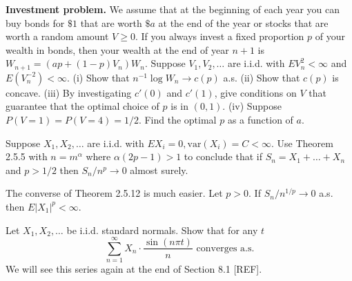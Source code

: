   \begin{exercise}[Durrett 2.4.3]
    \textbf{Investment problem.} We assume that at the beginning of each year you can buy bonds for $\$1$ that are worth $\$a$ at the end of the year or stocks that are worth a random amount $V \geq 0$. If you always invest a fixed proportion $p$ of your wealth in bonds, then your wealth at the end of year $n + 1$ is $W_{n+1} = (ap + (1 - p)V_n)W_n$. Suppose $V_1, V_2, \dots$ are i.i.d. with $EV_n^2 < \infty$ and $E(V_n^{-2}) < \infty$. (i) Show that $n^{-1} \log W_n \to c(p)$ a.s. (ii) Show that $c(p)$ is concave. (iii) By investigating $c'(0)$ and $c'(1)$, give conditions on $V$ that guarantee that the optimal choice of $p$ is in $(0, 1)$. (iv) Suppose $P(V = 1) = P(V = 4) = 1/2$. Find the optimal $p$ as a function of $a$.
  \end{exercise}
  \begin{solution}

  \end{solution}

  \begin{exercise}[Durrett 2.5.1]
    Suppose $X_1, X_2, \dots$ are i.i.d. with $EX_i = 0, \text{var}(X_i) = C < \infty$. Use Theorem 2.5.5 with $n = m^{\alpha}$ where $\alpha(2p - 1) > 1$ to conclude that if $S_n = X_1 + \dots + X_n$ and $p > 1/2$ then $S_n/n^p \to 0$ almost surely.
  \end{exercise}
  \begin{solution}

  \end{solution}

  \begin{exercise}[Durrett 2.5.2]
    The converse of Theorem 2.5.12 is much easier. Let $p > 0$. If $S_n/n^{1/p} \to 0$ a.s. then $E|X_1|^p < \infty$.
  \end{exercise}
  \begin{solution}

  \end{solution}

  \begin{exercise}[Durrett 2.5.3]
    Let $X_1, X_2, \dots$ be i.i.d. standard normals. Show that for any $t$
    \begin{equation*}
      \sum_{n=1}^{\infty} X_n \cdot \frac{\sin(n\pi t)}{n} \text{ converges a.s.}
    \end{equation*}
    We will see this series again at the end of Section 8.1 [REF].
  \end{exercise}
  \begin{solution}

  \end{solution}


